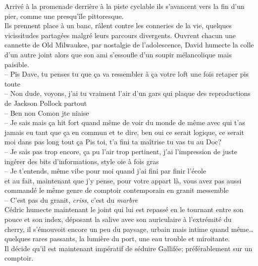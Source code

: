 Arrivé à la promenade derrière à la piste cyclable ils s'avancent vers la
fin d'un pier, comme une presqu'île pittoresque. \\ Ils prennent place à un
banc, râlent contre les conneries de la vie, quelques vicissitudes partagées
malgré leurs parcours divergents. Ouvrent chacun une cannette de Old Milwaukee,
par nostalgie de l'adolescence, David humecte la colle d'un autre joint alors que
son ami s'essoufle d'un soupir mélancolique mais paisible.
\\ -- Pis Dave, tu
penses tu que ça va ressembler à ça votre loft une fois retaper pis toute\\ 
-- Non dude, voyons, j'ai tu vraiment l'air d'un gars qui plaque des
reproductions de
Jackson 
Pollock partout \\
-- Ben non Comon jte niaise\\
-- Je sais mais ça hit fort quand même de voir du monde de même avec qui
t'as jamais eu tant que ça en commun et te dire, ben oui ce serait logique,
ce serait moi dans pas long tout ça \textelp{} Pis toi, t'a fini ta maîtrise tu
vas tu au Doc?\\
-- Je sais pas trop encore, ça pu l'air trop pertinent, j'ai l'impression
de juste ingérer des bits d'informations, style oie à fois gras\\
-- Je t'entends, même vibe pour moi quand j'ai fini par finir l'école\\

\textelp{} et au fait, maintenant que j'y pense, pour votre appart là, vous
avez pas aussi commandé le même genre de comptoir contemporain en granit
messemble\\
-- C'est pas du granit, \emph{criss}, c'est du \emph{marbre}\\

Cédric humecte maintenant le joint qui lui est repassé en le tournant entre son
pouce et son index, déposant la salive avec son auriculaire à l'extrémité du
cherry, il s'émouvoit encore un peu du paysage, urbain mais intime quand
même\ldots quelques rares passants, la lumière du port, une eau trouble et
miroitante.\\[1ex]
Il décide qu'il est maintenant impératif de séduire Gallifée; préférablement sur un comptoir.
\clearpage

